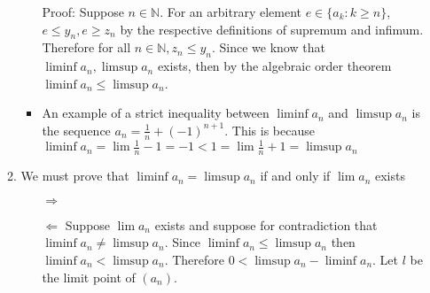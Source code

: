 \documentclass[12pt, letterpaper]{article}
\newcommand{\N}{\mathbb{N}}
\begin{document}
\begin{enumerate}
\begin{enumerate}
\begin{itemize}
				Proof:  Suppose $n \in \N$. For an arbitrary element $e \in \{a_k : k \geq n\}$, $e \leq y_n, e \geq z_n$ by the respective definitions of supremum and infimum.  Therefore for all $n \in \N, z_n \leq y_n$.  Since we know that $\liminf a_n, \limsup a_n$ exists, then by the algebraic order theorem $\liminf a_n \leq \limsup a_n$.
				\item An example of a strict inequality between $\liminf a_n$ and $\limsup a_n$ is the sequence $a_n = \frac{1}{n} + (-1)^{n+1}$.  
				This is because $\liminf a_n = \lim \frac{1}{n} - 1 = -1 < 1 = \lim \frac{1}{n} + 1 = \limsup a_n$
			\end{itemize}
			\item We must prove that $\liminf a_n = \limsup a_n$ if and only if $\lim a_n$ exists
			\begin{itemize}
				\item[$\Rightarrow$]
				\item[$\Leftarrow$] Suppose $\lim a_n$ exists and suppose for contradiction that $\liminf a_n \neq \limsup a_n$.  
				Since $\liminf a_n \leq \limsup a_n$ then $\liminf a_n < \limsup a_n$.  Therefore $0 < \limsup a_n - \liminf a_n$.  Let $l$ be the limit point of $(a_n)$.  
			\end{itemize}
		\end{enumerate}
	\end{enumerate}
\end{document}
